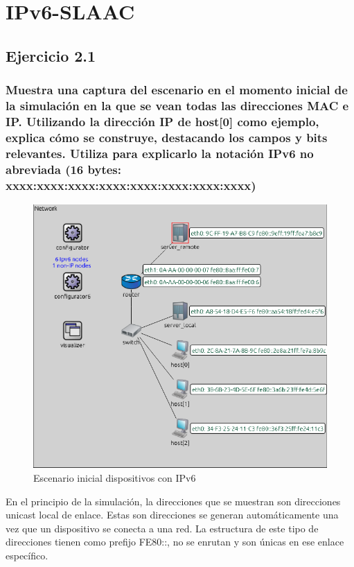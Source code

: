 \chapter{IPv6-SLAAC}
\label{chap:ipv6_slaac}

\section{Ejercicio 2.1}
\subsection{Muestra una captura del escenario en el momento inicial de la simulación en la que se vean todas las
direcciones MAC e IP. Utilizando la dirección IP de host[0] como ejemplo, explica cómo se construye, destacando
los campos y bits relevantes. Utiliza para explicarlo la notación IPv6 no abreviada (16 bytes:
xxxx:xxxx:xxxx:xxxx:xxxx:xxxx:xxxx:xxxx)}

\begin{figure}[!ht]
    \centering
    \includegraphics[width=135mm, scale=0.75]{imaxes/captura_ejer2_1.png}
    \caption{Escenario inicial dispositivos con IPv6}
    \label{fig:direccion_ipv6_host0}
\end{figure}

En el principio de la simulación, la direcciones que se muestran son direcciones unicast local de enlace. Estas son direcciones se generan automáticamente una vez que un dispositivo se conecta a una red. La estructura de este tipo de direcciones tienen como prefijo FE80::, no se enrutan y son únicas en ese enlace específico.

